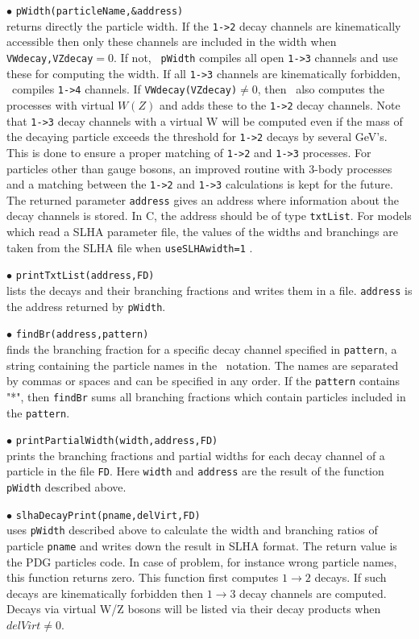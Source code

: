 \documentclass[12pt,a4paper]{article}
\begin{document}
\noindent
$\bullet$ \verb|pWidth(particleName,&address)|\\
returns directly the particle width. If the  \verb|1->2| 
decay channels are kinematically accessible then only these channels are
included in the width when \verb|VWdecay,VZdecay|$ = 0$.  If not, {\tt
pWidth} compiles all open \verb|1->3| channels and use these for  computing the width.
If all \verb|1->3| channels are kinematically forbidden, \micro\ compiles \verb|1->4| channels.
If \verb|VWdecay(VZdecay)|$\ne 0$, then \micro\  also computes the processes with virtual $W(Z)$  and adds these to the \verb|1->2| decay channels.
 Note that \verb|1->3| decay channels with a virtual W  will be computed even
if the mass of the decaying particle exceeds the threshold for \verb|1->2| decays by several GeV's. This is done to ensure a 
proper matching of \verb|1->2| and \verb|1->3| processes.  For  particles other than gauge bosons,
an improved routine with 3-body processes and a matching  between
the \verb|1->2| and \verb|1->3| calculations is kept for the future. 
The returned  parameter \verb|address| 
gives  an address where information about the decay channels is stored.
In C, the address should be of type {\tt  txtList}.
For models which read a SLHA parameter file, the values of the widths and branchings are taken from the SLHA
file when \verb|useSLHAwidth=1| .
  

\noindent
$\bullet$ \verb|printTxtList(address,FD)|\\
lists the decays and their branching fractions and writes them in a file.
{\tt address} is the address returned by {\tt pWidth}.  

\noindent
$\bullet$ \verb|findBr(address,pattern)|\\ 
finds the branching fraction for a specific decay channel specified in
{\tt pattern},  a string containing the particle names 
in the \calchep\ notation. The names are separated by commas or spaces and can be specified in any
order. If the  {\tt pattern} contains  "*", then {\tt findBr} sums all branching fractions
which contain particles included in the {\tt pattern}.  
 
 \noindent
 $\bullet$ \verb|printPartialWidth(width,address,FD)|\\ 
prints the branching fractions and partial widths for each decay channel of a particle in the file {\tt FD}.   Here {\tt width} and {\tt address} are the result of the function  {\tt pWidth} described above.


 
\noindent
$\bullet$ \verb|slhaDecayPrint(pname,delVirt,FD)|\\
uses \verb|pWidth| described above to calculate the width and branching ratios of particle \verb|pname| and writes down the result
in SLHA format. The return value is the PDG particles code. In case of problem, for
instance wrong particle names, this function returns zero. This function
first computes $1\to2$  decays. If such decays are kinematically
forbidden then $1\to3$ decay channels are computed. Decays via 
virtual W/Z bosons will be listed via their decay products when $delVirt \ne 0$.
\end{document}
